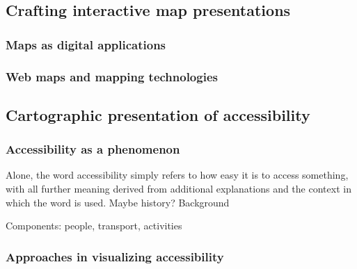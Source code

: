 \subsection{Crafting interactive map presentations}
\subsubsection{Maps as digital applications}

\subsubsection{Web maps and mapping technologies}



\subsection{Cartographic presentation of accessibility}

\subsubsection{Accessibility as a phenomenon}

Alone, the word accessibility simply refers to how easy it is to access something,
with all further meaning derived from
additional explanations and the context in which the word is used.
Maybe history? Background \parencite{ten2020}

Components: people, transport, activities \parencite{jar2018}




\subsubsection{Approaches in visualizing accessibility}



